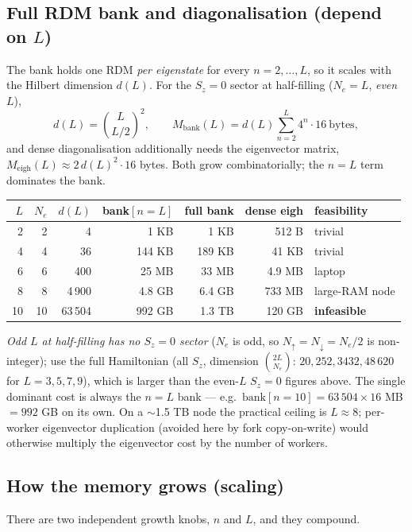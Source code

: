 \documentclass[11pt]{article}
\begin{document}
\subsection{Full RDM bank and diagonalisation (depend on $L$)}
The bank holds one RDM \emph{per eigenstate} for every $n=2,\dots,L$, so it
scales with the Hilbert dimension $d(L)$. For the $S_z{=}0$ sector at half-filling
($N_e=L$, \emph{even} $L$),
\[
  d(L)=\binom{L}{L/2}^{2},\qquad
  M_{\mathrm{bank}}(L)=d(L)\sum_{n=2}^{L}4^{n}\cdot 16\ \text{bytes},
\]
and dense diagonalisation additionally needs the eigenvector matrix,
$M_{\mathrm{eigh}}(L)\approx 2\,d(L)^{2}\cdot 16$ bytes. Both grow
combinatorially; the $n{=}L$ term dominates the bank.
\begin{center}
\begin{tabular}{@{}rrrrrrl@{}}
\toprule
$L$ & $N_e$ & $d(L)$ & bank$[n{=}L]$ & full bank & dense eigh & feasibility \\ \midrule
2  & 2  & 4       & 1 KB    & 1 KB    & 512 B  & trivial \\
4  & 4  & 36      & 144 KB  & 189 KB  & 41 KB  & trivial \\
6  & 6  & 400     & 25 MB   & 33 MB   & 4.9 MB & laptop \\
8  & 8  & 4\,900  & 4.8 GB  & 6.4 GB  & 733 MB & large-RAM node \\
10 & 10 & 63\,504 & 992 GB  & 1.3 TB  & 120 GB & \textbf{infeasible} \\
\bottomrule
\end{tabular}
\end{center}
\emph{Odd $L$ at half-filling has no $S_z{=}0$ sector} ($N_e$ is odd, so
$N_\uparrow=N_\downarrow=N_e/2$ is non-integer); use the full Hamiltonian (all
$S_z$, dimension $\binom{2L}{N_e}$: $20, 252, 3432, 48\,620$ for $L=3,5,7,9$),
which is larger than the even-$L$ $S_z{=}0$ figures above. The single dominant
cost is always the $n{=}L$ bank --- e.g.\ $\text{bank}[n{=}10]=63\,504\times16$ MB
$=992$ GB on its own. On a $\sim$1.5 TB node the practical ceiling is
$L\approx8$; per-worker eigenvector duplication (avoided here by fork
copy-on-write) would otherwise multiply the eigenvector cost by the number of
workers.

\subsection{How the memory grows (scaling)}\label{sec:scaling}
There are two independent growth knobs, $n$ and $L$, and they compound.
\end{document}
